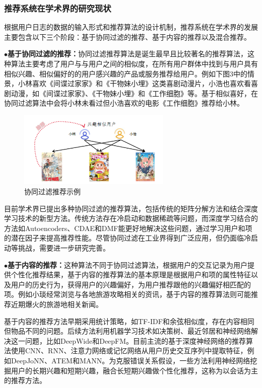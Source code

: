 \documentclass[withoutpreface,bwprint]{cumcmthesis} %
\begin{document}
	\subsubsection{ 推荐系统在学术界的研究现状}
	根据用户日志的数据的输入形式和推荐算法的设计机制，推荐系统在学术界的发展主要包含以下三个阶段：基于协同过滤的推荐、基于内容的推荐以及混合推荐。\par
	$\bullet$\textbf{基于协同过滤的推荐：}协同过滤推荐算法是诞生最早且比较著名的推荐算法，这种算法主要考虑了用户与与用户之间的相似度，在所有用户群体中找到与用户具有相似兴趣、相似偏好的的用户感兴趣的产品或服务推荐给用户。例如下图3中的情景，小林喜欢《间谍过家家》和《干物妹小埋》这类喜剧动漫片，小浩也喜欢看喜剧动漫，如《间谍过家家》、《干物妹小埋》和《工作细胞》等。基于相似喜好，在协同过滤算法中会将小林未看过但小浩喜欢的电影《工作细胞》推荐给小林。\par
	\begin{figure}[H]
		\centering
		\includegraphics[width=0.65\textwidth]{3}
		\caption{协同过滤推荐示例}
		\label{fig:circuit-diagcam}
	\end{figure}
	目前学术界已提出多种协同过滤的推荐算法，包括传统的矩阵分解方法和结合深度学习技术的新型方法。传统方法存在冷启动和数据稀疏等问题，而深度学习结合的方法如Autoencoders、CDAE和DMF能更好地解决这些问题，通过学习用户和项的潜在因子来提高推荐性能。尽管协同过滤在工业界得到广泛应用，但仍面临冷启动等挑战，需要进一步研究完善。\par
	$\bullet$\textbf{基于内容的推荐：}这种算法不同于协同过滤算法，根据用户的交互记录为用户提供个性化推荐结果，基于内容的推荐算法的基本原理是根据用户和项的属性特征以及用户的历史行为，获得用户的兴趣偏好，为用户推荐跟他的兴趣偏好相匹配的项。例如小琰经常浏览与各地旅游攻略相关的资讯，基于内容的推荐算法则可能推荐近期爆火的旅游地相关新闻。\par
	基于内容的推荐方法早期采用统计策略，如TF-IDF和余弦相似度，存在内容相同但物品不同的问题。后续方法利用机器学习技术如决策树、最近邻居和神经网络解决这一问题，比如DeepWide和DeepFM。目前主流的基于深度神经网络的推荐算法使用CNN、RNN、注意力网络或记忆网络从用户历史交互序列中提取特征，例如DeepJoNN、ATEM和MANN。为克服错误关系假设，一些方法利用神经网络挖掘用户的长期兴趣和短期兴趣，融合长短期兴趣做个性化推荐，这称为以会话为主的推荐方法。\par
\end{document}
